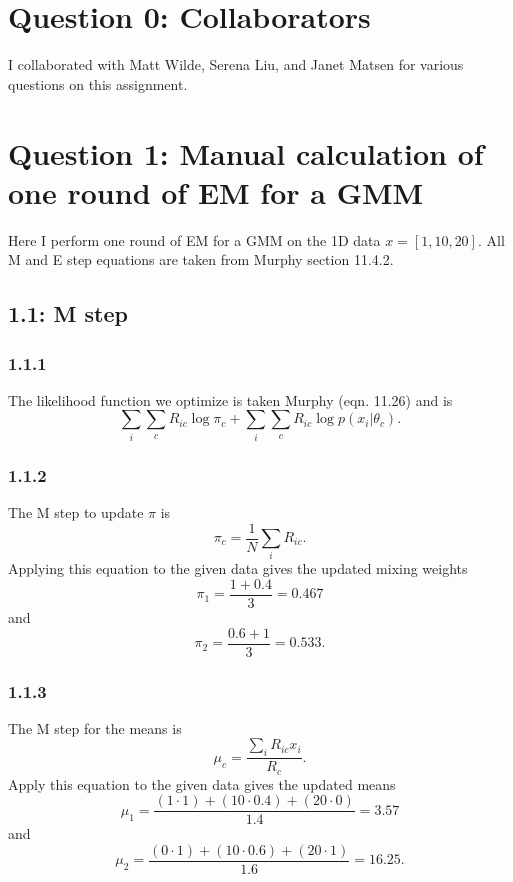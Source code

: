 \documentclass[12pt]{amsart}
\begin{document}
\section*{Question 0: Collaborators}
I collaborated with Matt Wilde, Serena Liu, and Janet Matsen for various questions on this assignment.

\section*{Question 1: Manual calculation of one round of EM for a GMM}
Here I perform one round of EM for a GMM on the 1D data $x = [1,10,20]$.  All M and E step equations are taken from Murphy section 11.4.2.

\subsection*{1.1: M step}
\subsubsection*{1.1.1}
The likelihood function we optimize is taken Murphy (eqn. 11.26) and is
\begin{equation}
\sum_i \sum_c R_{ic} \log \pi_c + \sum_i \sum_c R_{ic} \log p(x_i | \theta_c).
\end{equation}
\subsubsection*{1.1.2}
The M step to update $\pi$ is 
\begin{equation}
\pi_c = \frac{1}{N} \sum_i R_{ic}.
\end{equation}
Applying this equation to the given data gives the updated mixing weights
\begin{equation}
\pi_1 = \frac{1 + 0.4}{3} = 0.467
\end{equation}
and 
\begin{equation}
\pi_2 = \frac{0.6 + 1}{3} = 0.533.
\end{equation}

\subsubsection*{1.1.3}
The M step for the means is
\begin{equation}
\mu_c = \frac{\sum_i R_{ic} x_i}{R_c}.
\end{equation}
Apply this equation to the given data gives the updated means
\begin{equation}
\mu_1 = \frac{(1 \cdot 1) + (10 \cdot 0.4) + (20 \cdot 0)}{1.4} = 3.57
\end{equation}
and
\begin{equation}
\mu_2 = \frac{(0 \cdot 1) + (10 \cdot 0.6) + (20 \cdot 1)}{1.6} = 16.25.
\end{equation}
\end{document}

